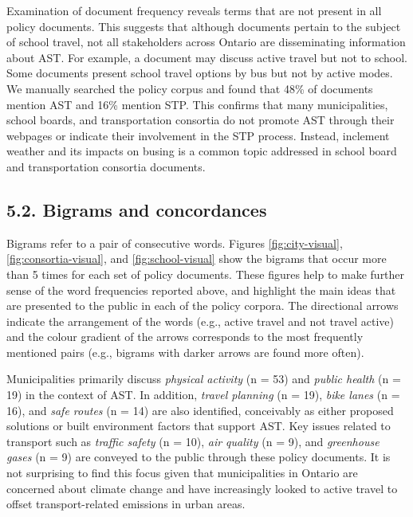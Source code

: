 \documentclass[]{elsarticle} %
\begin{document}
Examination of document frequency reveals terms that are not present in
all policy documents. This suggests that although documents pertain to
the subject of school travel, not all stakeholders across Ontario are
disseminating information about AST. For example, a document may discuss
active travel but not to school. Some documents present school travel
options by bus but not by active modes. We manually searched the policy
corpus and found that 48\% of documents mention AST and 16\% mention
STP. This confirms that many municipalities, school boards, and
transportation consortia do not promote AST through their webpages or
indicate their involvement in the STP process. Instead, inclement
weather and its impacts on busing is a common topic addressed in school
board and transportation consortia documents.

\hypertarget{bigrams-and-concordances}{%
\subsection{5.2. Bigrams and
concordances}\label{bigrams-and-concordances}}

Bigrams refer to a pair of consecutive words. Figures
\ref{fig:city-visual}, \ref{fig:consortia-visual}, and
\ref{fig:school-visual} show the bigrams that occur more than 5 times
for each set of policy documents. These figures help to make further
sense of the word frequencies reported above, and highlight the main
ideas that are presented to the public in each of the policy corpora.
The directional arrows indicate the arrangement of the words (e.g.,
active travel and not travel active) and the colour gradient of the
arrows corresponds to the most frequently mentioned pairs (e.g., bigrams
with darker arrows are found more often).

Municipalities primarily discuss \emph{physical activity} (n = 53) and
\emph{public health} (n = 19) in the context of AST. In addition,
\emph{travel planning} (n = 19), \emph{bike lanes} (n = 16), and
\emph{safe routes} (n = 14) are also identified, conceivably as either
proposed solutions or built environment factors that support AST. Key
issues related to transport such as \emph{traffic safety} (n = 10),
\emph{air quality} (n = 9), and \emph{greenhouse gases} (n = 9) are
conveyed to the public through these policy documents. It is not
surprising to find this focus given that municipalities in Ontario are
concerned about climate change and have increasingly looked to active
travel to offset transport-related emissions in urban areas.
\end{document}
